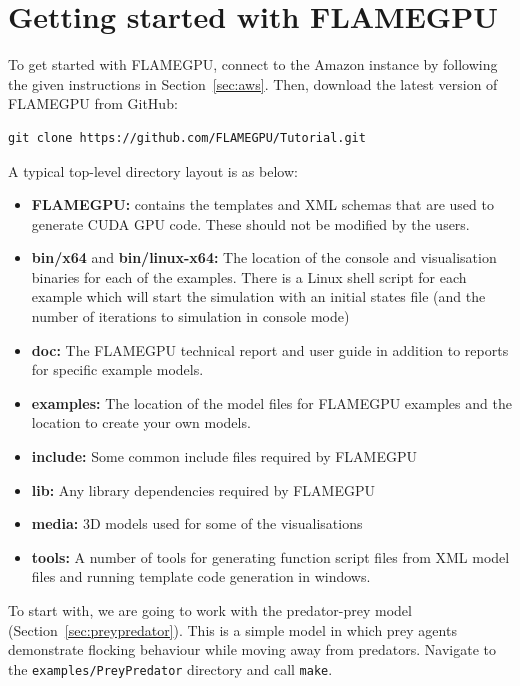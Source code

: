 \section{Getting started with FLAMEGPU}\label{sec:hands-on}

To get started with FLAMEGPU, connect to the Amazon instance by following the given instructions in Section~\ref{sec:aws}. Then, download the latest version of FLAMEGPU from GitHub:

\begin{verbatim}
git clone https://github.com/FLAMEGPU/Tutorial.git
\end{verbatim}


A typical top-level directory layout is as below:

\begin{itemize}
\item \textbf{FLAMEGPU:} contains the templates and XML schemas that are used to generate CUDA GPU code. These should not be modified by the users.
\item \textbf{bin/x64} and \textbf{bin/linux-x64:} The location of the console and visualisation binaries for each of the examples. There is a Linux shell script for each example which will start the simulation with an initial states file (and the number of iterations to simulation in console mode)
\item \textbf{doc:} The FLAMEGPU technical report and user guide in addition to reports for specific example models.
\item \textbf{examples:} The location of the model files for FLAMEGPU examples and the location to create your own models.
\item \textbf{include:} Some common include files required by FLAMEGPU
\item \textbf{lib:} Any library dependencies required by FLAMEGPU
\item \textbf{media:} 3D models used for some of the visualisations
\item \textbf{tools:} A number of tools for generating function script files from XML model files and running template code generation in windows.
\end{itemize}

To start with, we are going to work with the predator-prey model (Section~\ref{sec:preypredator}). This is a simple model in which prey agents demonstrate flocking behaviour while moving away from predators. Navigate to the \verb|examples/PreyPredator| directory and call \verb|make|.

